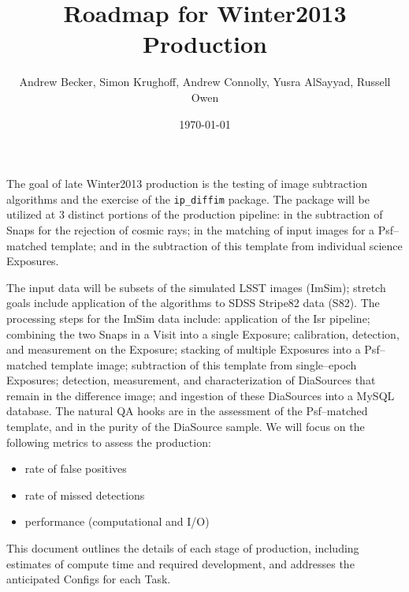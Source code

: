 \documentclass[prd, nofootinbib, floatfix, 11pt,tightenlines,times]{article}
\author{Andrew Becker, Simon Krughoff, Andrew Connolly, Yusra AlSayyad, Russell Owen}
\title{Roadmap for Winter2013 Production}
\date{\today}
\begin{document}
\maketitle

The goal of late Winter2013 production is the testing of image
subtraction algorithms and the exercise of the {\tt ip\_diffim}
package.  The package will be utilized at 3 distinct portions of the
production pipeline: in the subtraction of Snaps for the rejection of
cosmic rays; in the matching of input images for a Psf--matched
template; and in the subtraction of this template from individual
science Exposures.

The input data will be subsets of the simulated LSST images (ImSim);
stretch goals include application of the algorithms to SDSS Stripe82
data (S82).  The processing steps for the ImSim data include:
application of the Isr pipeline; combining the two Snaps in a Visit
into a single Exposure; calibration, detection, and measurement on the
Exposure; stacking of multiple Exposures into a Psf--matched template
image; subtraction of this template from single--epoch Exposures;
detection, measurement, and characterization of DiaSources that remain
in the difference image; and ingestion of these DiaSources into a
MySQL database.  The natural QA hooks are in the assessment of the
Psf--matched template, and in the purity of the DiaSource sample.  We
will focus on the following metrics to assess the production:
\begin{itemize}
\item rate of false positives
\item rate of missed detections
\item performance (computational and I/O)
\end{itemize}
This document outlines the details of each stage of production, 
including estimates of compute time and required development, and addresses the anticipated
Configs for each Task.

\clearpage
\tableofcontents
\clearpage

\end{document}

